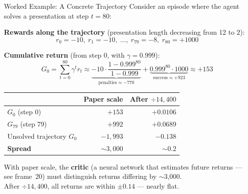 \documentclass[aspectratio=169,11pt]{beamer}
\begin{document}
\begin{frame}{Worked Example: A Concrete Trajectory}
  \small
  Consider an episode where the agent solves a presentation at step $t = 80$:

  \medskip
  \textbf{Rewards along the trajectory} (presentation length decreasing from 12 to 2):
  \[
    r_0 = -10,\; r_1 = -10,\; \ldots,\; r_{79} = -8,\; r_{80} = +1000
  \]

  \textbf{Cumulative return} (from step 0, with $\gamma = 0.999$):
  \[
    G_0 = \sum_{t=0}^{80} \gamma^t r_t
    \approx \underbrace{-10 \cdot \frac{1 - 0.999^{80}}{1 - 0.999}}_{\text{penalties} \approx -770}
    + \underbrace{0.999^{80} \cdot 1000}_{\text{success} \approx +923}
    \approx +153
  \]

  \medskip
  \begin{center}
  \begin{tabular}{lrr}
    \toprule
    & \textbf{Paper scale} & \textbf{After $\div 14{,}400$} \\
    \midrule
    $G_0$ (step 0) & $+153$ & $+0.0106$ \\
    $G_{79}$ (step 79) & $+992$ & $+0.0689$ \\
    Unsolved trajectory $G_0$ & $-1{,}993$ & $-0.138$ \\
    \midrule
    \textbf{Spread} & $\sim 3{,}000$ & $\sim 0.2$ \\
    \bottomrule
  \end{tabular}
  \end{center}

  \smallskip
  With paper scale, the \textbf{critic} (a neural network that estimates future returns --- see frame~20)
  must distinguish returns differing by $\sim$3{,}000.\\
  After $\div 14{,}400$, all returns are within $\pm 0.14$ --- nearly flat.
\end{frame}
\end{document}

